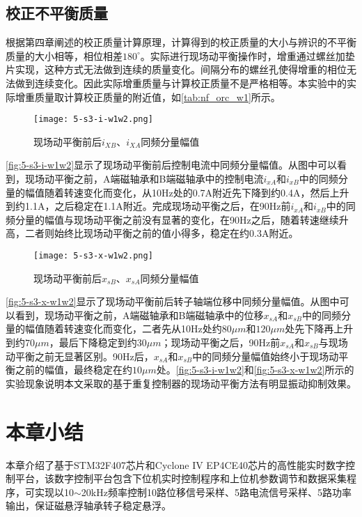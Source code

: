 \documentclass[
  lang=cn,
  degree=master,
  openany,oneside
]{nuaathesis}
\begin{document}
\subsection{校正不平衡质量}

根据第四章阐述的校正质量计算原理，计算得到的校正质量的大小与辨识的不平衡质量的大小相等，相位相差$180^{\circ}$。实际进行现场动平衡操作时，增重通过螺丝加垫片实现，这种方式无法做到连续的质量变化。间隔分布的螺丝孔使得增重的相位无法做到连续变化。因此实际增重质量与计算校正质量不是严格相等。本实验中的实际增重质量取计算校正质量的附近值，如\autoref{tab:nf_orc_w1}所示。

\begin{figure}[h!]
	\texttt{[image: 5-s3-i-w1w2.png]}
	\caption{现场动平衡前后$i_{XB}$、$i_{XA}$同频分量幅值}
	\label{fig:5-s3-i-w1w2}
\end{figure}

\autoref{fig:5-s3-i-w1w2}显示了现场动平衡前后控制电流中同频分量幅值。从图中可以看到，现场动平衡之前，A端磁轴承和B端磁轴承中的控制电流$i_{xA}$和$i_{xB}$中的同频分量的幅值随着转速变化而变化，从10Hz处的0.7A附近先下降到约0.4A，然后上升到约1.1A，之后稳定在1.1A附近。完成现场动平衡之后，在90Hz前$i_{xA}$和$i_{xB}$中的同频分量的幅值与现场动平衡之前没有显著的变化，在90Hz之后，随着转速继续升高，二者则始终比现场动平衡之前的值小得多，稳定在约0.3A附近。

\begin{figure}[h!]
	\texttt{[image: 5-s3-x-w1w2.png]}
	\caption{现场动平衡前后$x_{sB}$、$x_{sA}$同频分量幅值}
	\label{fig:5-s3-x-w1w2}
\end{figure}

\autoref{fig:5-s3-x-w1w2}显示了现场动平衡前后转子轴端位移中同频分量幅值。从图中可以看到，现场动平衡之前，A端磁轴承和B端磁轴承中的位移$x_{sA}$和$x_{sB}$中的同频分量的幅值随着转速变化而变化，二者先从10Hz处约$80 \mu m$和$120 \mu m$处先下降再上升到约$70\mu m$，最后下降稳定到约$30 \mu m$；现场动平衡之后，90Hz前$x_{sA}$和$x_{sB}$与现场动平衡之前无显著区别。90Hz后，$x_{sA}$和$x_{sB}$中的同频分量幅值始终小于现场动平衡之前的幅值，最终稳定在约$10 \mu m$处。\autoref{fig:5-s3-i-w1w2}和\autoref{fig:5-s3-x-w1w2}所示的实验现象说明本文采取的基于重复控制器的现场动平衡方法有明显振动抑制效果。

\section{本章小结}
本章介绍了基于STM32F407芯片和Cyclone IV EP4CE40芯片的高性能实时数字控制平台，该数字控制平台包含下位机实时控制程序和上位机参数调节和数据采集程序，可实现以10$\sim$20kHz频率控制10路位移信号采样、5路电流信号采样、5路功率输出，保证磁悬浮轴承转子稳定悬浮。
\end{document}
